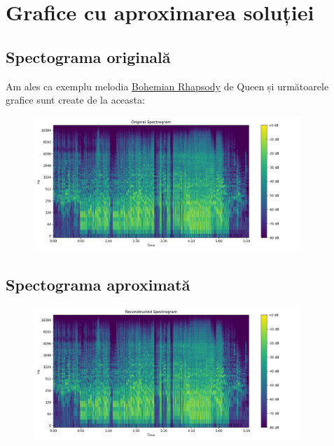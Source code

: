 \documentclass[12pt]{article}
\begin{document}
\newpage

\section{Grafice cu aproximarea soluției}

\subsection{Spectograma originală}

Am ales ca exemplu melodia \href{https://www.youtube.com/watch?v=fJ9rUzIMcZQ&ab_channel=QueenOfficial}{Bohemian Rhapsody} de Queen și următoarele grafice sunt create de la aceasta:

\begin{figure}[h!]
    \centering
    \includegraphics[width=0.9\textwidth]{spectrogram_original.png}
\end{figure}

\subsection{Spectograma aproximată}

\begin{figure}[h!]
    \centering
    \includegraphics[width=0.9\textwidth]{spectrogram_reconstructed.png}
\end{figure}
\end{document}

